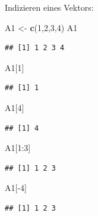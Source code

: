 \documentclass[
  ignorenonframetext,
]{beamer}
\newenvironment{Shaded}{\begin{snugshade}}{\end{snugshade}}
\newcommand{\DecValTok}[1]{\textcolor[rgb]{0.27,0.67,0.26}{#1}}
\newcommand{\KeywordTok}[1]{\textcolor[rgb]{0.26,0.66,0.93}{\textbf{#1}}}
\newcommand{\NormalTok}[1]{\textcolor[rgb]{0.74,0.68,0.62}{#1}}
\newcommand{\OperatorTok}[1]{\textcolor[rgb]{0.74,0.68,0.62}{#1}}
\newcommand{\StringTok}[1]{\textcolor[rgb]{0.02,0.61,0.04}{#1}}
\begin{document}
\begin{frame}[fragile]{Indizieren eines Vektors:}
\protect\hypertarget{indizieren-eines-vektors}{}

\begin{Shaded}
\begin{Highlighting}[]
\NormalTok{A1 <-}\StringTok{ }\KeywordTok{c}\NormalTok{(}\DecValTok{1}\NormalTok{,}\DecValTok{2}\NormalTok{,}\DecValTok{3}\NormalTok{,}\DecValTok{4}\NormalTok{)}
\NormalTok{A1}
\end{Highlighting}
\end{Shaded}

\begin{verbatim}
## [1] 1 2 3 4
\end{verbatim}

\begin{Shaded}
\begin{Highlighting}[]
\NormalTok{A1[}\DecValTok{1}\NormalTok{]}
\end{Highlighting}
\end{Shaded}

\begin{verbatim}
## [1] 1
\end{verbatim}

\begin{Shaded}
\begin{Highlighting}[]
\NormalTok{A1[}\DecValTok{4}\NormalTok{]}
\end{Highlighting}
\end{Shaded}

\begin{verbatim}
## [1] 4
\end{verbatim}

\begin{Shaded}
\begin{Highlighting}[]
\NormalTok{A1[}\DecValTok{1}\OperatorTok{:}\DecValTok{3}\NormalTok{]}
\end{Highlighting}
\end{Shaded}

\begin{verbatim}
## [1] 1 2 3
\end{verbatim}

\begin{Shaded}
\begin{Highlighting}[]
\NormalTok{A1[}\OperatorTok{-}\DecValTok{4}\NormalTok{]}
\end{Highlighting}
\end{Shaded}

\begin{verbatim}
## [1] 1 2 3
\end{verbatim}

\end{frame}
\end{document}
